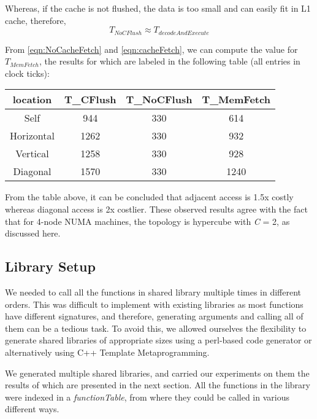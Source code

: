 Whereas, if the cache is not flushed, the data is too small and can easily fit in L1 cache, therefore, 
\begin{dmath}
\label{eqn:cacheFetch}
T_{NoCFlush} \approx T_{decodeAndExecute}
\end{dmath}

From \ref{eqn:NoCacheFetch} and \ref{eqn:cacheFetch}, we can compute the value for $T_{MemFetch}$, the
results for which are labeled in the following table (all entries in clock ticks):

\begin{center}
\begin{tabular}{c|c|c|c}
\hline
location & T_{CFlush} & T_{NoCFlush} & T_{MemFetch}\\
\hline
Self & 944 & 330 & 614\\
Horizontal & 1262 & 330 & 932 \\
Vertical & 1258 & 330 & 928\\
Diagonal & 1570 & 330 & 1240\\
\hline
\end{tabular}
\end{center}

From the table above, it can be concluded that adjacent access is 1.5x costly whereas diagonal access is
2x costlier. These observed results agree with the fact that for 4-node NUMA machines, the topology is
hypercube with \textit{C} = 2, as discussed here\cite{Drepper07whatevery}.

\subsection{Library Setup}
We needed to call all the functions in shared library multiple times in different orders. This was difficult
to implement with existing libraries as most functions have different signatures, and therefore, generating
arguments and calling all of them can be a tedious task. To avoid this, we allowed ourselves the flexibility
to generate shared libraries of appropriate sizes using a perl-based code generator or alternatively using
C++ Template Metaprogramming.\cite{templateMeta}

We generated multiple shared libraries, and carried our experiments on them the results of which are presented
in the next section. All the functions in the library were indexed in a \textit{functionTable}, from where they
could be called in various different ways.
